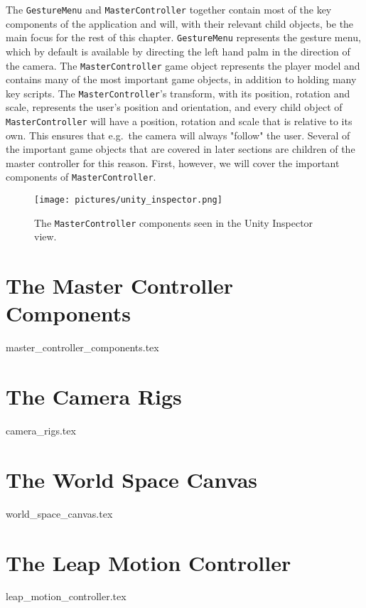 The \texttt{GestureMenu} and \texttt{MasterController} together contain most of the key components of the application and will, with their relevant child objects,
be the main focus for the rest of this chapter. \texttt{GestureMenu} represents the gesture menu, which by default is available by directing the left hand palm in the 
direction of the camera. The \texttt{MasterController} game object represents the player model and contains many of the most important game objects, in addition to
holding many key scripts. The \texttt{MasterController}'s transform, with its position, rotation and scale, represents the user's position and orientation, 
and every child object of \texttt{MasterController} will have a position, rotation and scale that is relative to its own. This ensures
that e.g.~the camera will always "follow" the user. Several of the important game objects that are covered in later sections are children of 
the master controller for this reason. First, however, we will cover the important components of \texttt{MasterController}.

\begin{figure}%
	\texttt{[image: pictures/unity\_inspector.png]} %
	\caption[The \texttt{MasterController} components]{The \texttt{MasterController} components seen in the Unity Inspector view.}
	\label{fig:unity_inspector}
\end{figure} 

\section{The Master Controller Components}
{master_controller_components.tex}


\section{The Camera Rigs}
\label{sec:camera_rigs}
{camera_rigs.tex}


\section{The World Space Canvas}
\label{sec:world_space_canvas}
{world_space_canvas.tex}


\section{The Leap Motion Controller}
\label{sec:leap_motion_controller}
{leap_motion_controller.tex}


